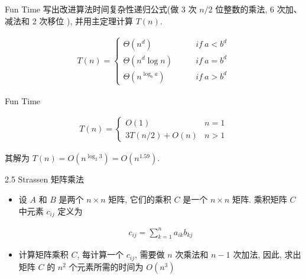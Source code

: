\documentclass[fontset=fandol,UTF8,fleqn]{beamer}
\begin{document}
\begin{frame}{Fun Time}
写出改进算法时间复杂性递归公式(做 3 次 $n/2$ 位整数的乘法, 6 次加、减法和 2 次移位
), 并用主定理计算 $T(n)$.
\begin{theorem}[主定理]
  \begin{eqnarray*}
    T(n) = \left\{
        \begin{array}{ll}
          \Theta(n^d) &\qquad  if\ a < b^d  \\
\Theta(n^d\log n) &\qquad  if \ a = b^d  \\
\Theta(n^{\log_ba}) &\qquad  if\ a > b^d
        \end{array}
\right. 
  \end{eqnarray*}
\end{theorem}
\end{frame}

\begin{frame}{Fun Time}
  \begin{exampleblock}{}
    \begin{eqnarray*}
  T(n)=\left\{\begin{array}{ll}
O(1) & n = 1   \\
3T(n/2)+O(n) & n>1   
\end{array} \right. 
    \end{eqnarray*}
  \end{exampleblock}
  其解为 $T(n)=O(n^{\log_2 3})=O(n^{1. 59})$.  
\end{frame}

\begin{frame}{2.5 Strassen 矩阵乘法}
\begin{itemize}[<+-|alert@+>]
\item 设 $A$ 和 $B$ 是两个 $n\times n$ 矩阵, 它们的乘积 $C$ 是一个
  $n\times n$ 矩阵. 乘积矩阵 $C$ 中元素 $c_{ij}$ 定义为
  
\begin{eqnarray*}
  c_{ij}=\sum_{k=1}^na_{ik}b_{kj} 
\end{eqnarray*}
\item 计算矩阵乘积 $C$, 每计算一个 $c_{ij}$, 需要做 $n$ 次乘法和 $n-1$ 次加法, 因此, 求出矩阵 $C$ 的 $n^2$ 个元素所需的时间为 $O(n^3)$ 
\end{itemize}
\end{frame}
\end{document}
